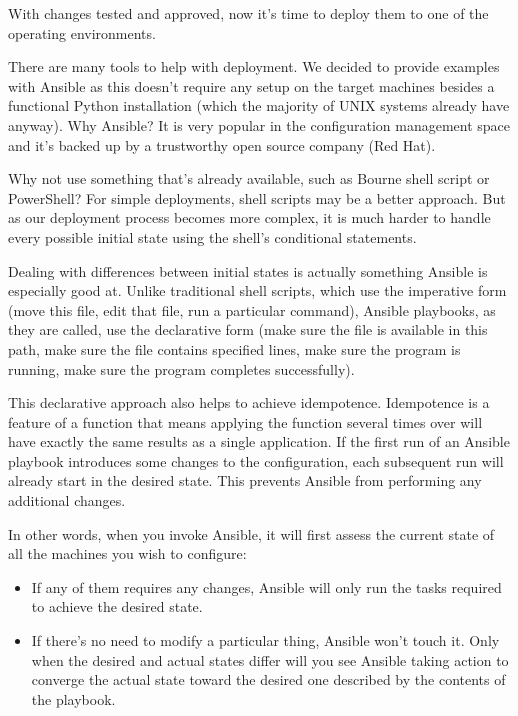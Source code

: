
With changes tested and approved, now it's time to deploy them to one of the operating environments.

There are many tools to help with deployment. We decided to provide examples with Ansible as this doesn't require any setup on the target machines besides a functional Python installation (which the majority of UNIX systems already have anyway). Why Ansible? It is very popular in the configuration management space and it's backed up by a trustworthy open source company (Red Hat).


Why not use something that's already available, such as Bourne shell script or PowerShell? For simple deployments, shell scripts may be a better approach. But as our deployment process becomes more complex, it is much harder to handle every possible initial state using the shell's conditional statements.

Dealing with differences between initial states is actually something Ansible is especially good at. Unlike traditional shell scripts, which use the imperative form (move this file, edit that file, run a particular command), Ansible playbooks, as they are called, use the declarative form (make sure the file is available in this path, make sure the file contains specified lines, make sure the program is running, make sure the program completes successfully).

This declarative approach also helps to achieve idempotence. Idempotence is a feature of a function that means applying the function several times over will have exactly the same results as a single application. If the first run of an Ansible playbook introduces some changes to the configuration, each subsequent run will already start in the desired state. This prevents Ansible from performing any additional changes.

In other words, when you invoke Ansible, it will first assess the current state of all the machines you wish to configure:

\begin{itemize}
\item 
If any of them requires any changes, Ansible will only run the tasks required to achieve the desired state.

\item 
If there's no need to modify a particular thing, Ansible won't touch it. Only when the desired and actual states differ will you see Ansible taking action to converge the actual state toward the desired one described by the contents of the playbook.
\end{itemize}

